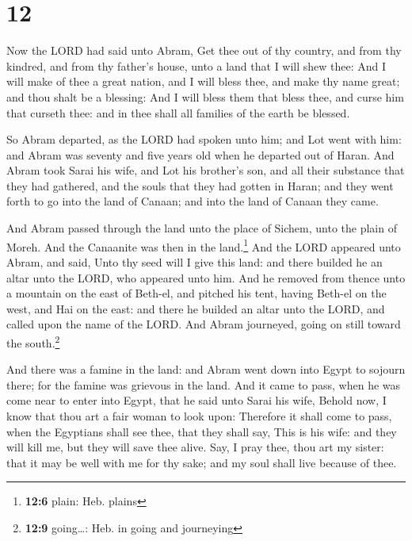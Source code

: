 \hypertarget{section-11}{%
\section{12}\label{section-11}}

 Now the LORD had said unto Abram, Get thee out of thy
country, and from thy kindred, and from thy father's house, unto a land
that I will shew thee:  And I will make of thee a great
nation, and I will bless thee, and make thy name great; and thou shalt
be a blessing:  And I will bless them that bless thee, and
curse him that curseth thee: and in thee shall all families of the earth
be blessed.

 So Abram departed, as the LORD had spoken unto him; and
Lot went with him: and Abram was seventy and five years old when he
departed out of Haran.  And Abram took Sarai his wife, and
Lot his brother's son, and all their substance that they had gathered,
and the souls that they had gotten in Haran; and they went forth to go
into the land of Canaan; and into the land of Canaan they came.

 And Abram passed through the land unto the place of
Sichem, unto the plain of Moreh. And the Canaanite was then in the
land.\footnote{\textbf{12:6} plain: Heb. plains}  And the
LORD appeared unto Abram, and said, Unto thy seed will I give this land:
and there builded he an altar unto the LORD, who appeared unto him.
 And he removed from thence unto a mountain on the east of
Beth-el, and pitched his tent, having Beth-el on the west, and Hai on
the east: and there he builded an altar unto the LORD, and called upon
the name of the LORD.  And Abram journeyed, going on still
toward the south.\footnote{\textbf{12:9} going\ldots: Heb. in going and
  journeying}

 And there was a famine in the land: and Abram went down
into Egypt to sojourn there; for the famine was grievous in the land.
 And it came to pass, when he was come near to enter into
Egypt, that he said unto Sarai his wife, Behold now, I know that thou
art a fair woman to look upon:  Therefore it shall come
to pass, when the Egyptians shall see thee, that they shall say, This is
his wife: and they will kill me, but they will save thee alive.
 Say, I pray thee, thou art my sister: that it may be
well with me for thy sake; and my soul shall live because of thee.

